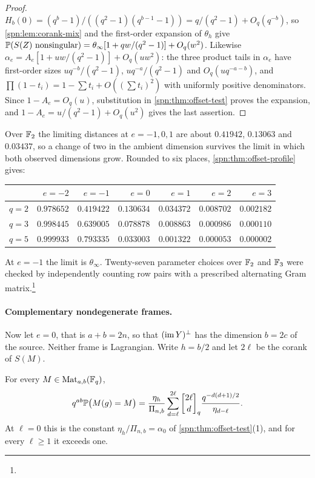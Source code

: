 \begin{proof}
$H_b(0)=(q^b-1)/((q^2-1)(q^{b-1}-1))=q/(q^2-1)+O_q(q^{-b})$, so \cref{spn:lem:corank-mix} and the
first-order expansion of $\theta_h$ give
$\mathbb{P}(S(Z)\text{ nonsingular})=\theta_\infty[1+qw/(q^2-1)]+O_q(w^2)$. Likewise
$\alpha_e=A_e[1+uw/(q^2-1)]+O_q(uw^2)$: the three product tails in $\alpha_e$ have first-order
sizes $uq^{-b}/(q^2-1)$, $uq^{-a}/(q^2-1)$ and $O_q(uq^{-a-b})$, and
$\prod(1-t_i)=1-\sum t_i+O((\sum t_i)^2)$ with uniformly positive denominators. Since
$1-A_e=O_q(u)$, substitution in \cref{spn:thm:offset-test} proves the expansion, and
$1-A_e=u/(q^2-1)+O_q(u^2)$ gives the last assertion.
\end{proof}

Over $\mathbb{F}_2$ the limiting distances at $e=-1,0,1$ are about $0.41942$, $0.13063$ and $0.03437$, so a
change of two in the ambient dimension survives the limit in which both observed dimensions grow.
Rounded to six places, \cref{spn:thm:offset-profile} gives:
\begin{center}\small
\begin{tabular}{lrrrrrr}
\toprule
 & $e=-2$ & $e=-1$ & $e=0$ & $e=1$ & $e=2$ & $e=3$\\
\midrule
$q=2$ & $0.978652$ & $0.419422$ & $0.130634$ & $0.034372$ & $0.008702$ & $0.002182$\\
$q=3$ & $0.998445$ & $0.639005$ & $0.078878$ & $0.008863$ & $0.000986$ & $0.000110$\\
$q=5$ & $0.999933$ & $0.793335$ & $0.033003$ & $0.001322$ & $0.000053$ & $0.000002$\\
\bottomrule
\end{tabular}
\end{center}
At $e=-1$ the limit is $\theta_\infty$. Twenty-seven parameter choices over $\mathbb{F}_2$ and $\mathbb{F}_3$ were
checked by independently counting row pairs with a prescribed alternating Gram
matrix.\footnote{}

\paragraph{Complementary nondegenerate frames.}
Now let $e=0$, that is $a+b=2n$, so that $(\operatorname{im} Y)^\perp$ has the dimension $b=2c$ of the source.
Neither frame is Lagrangian. Write $h=b/2$ and let $2\ell$ be the corank of $S(M)$.

\begin{proposition}\label{spn:thm:balanced}
For every $M\in\operatorname{Mat}_{a,b}(\mathbb{F}_q)$,
\[
 q^{ab}\spnP\bigl(M(g)=M\bigr)=\frac{\eta_h}{\Pi_{n,b}}
 \sum_{d=\ell}^{2\ell}\spnqbin{2\ell}{d}{q}\frac{q^{-d(d+1)/2}}{\eta_{d-\ell}} .
\]
At $\ell=0$ this is the constant $\eta_h/\Pi_{n,b}=\alpha_0$ of \cref{spn:thm:offset-test}(1), and
for every $\ell\ge1$ it exceeds one.
\end{proposition}

